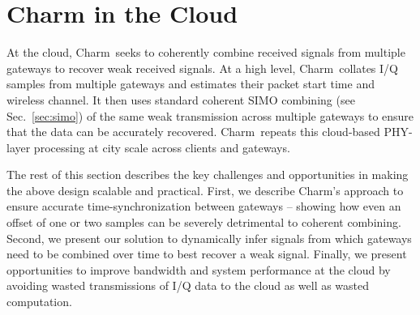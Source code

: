 \section{Charm in the Cloud}
\label{sec:cloud}


At the cloud, Charm\ seeks to coherently combine received signals from multiple gateways to recover weak received signals. At a high level, Charm\ collates I/Q samples from multiple gateways and estimates their packet start time and wireless channel. It then uses standard coherent SIMO combining (see Sec.~\ref{sec:simo}) of the same weak transmission across multiple gateways to ensure that the data can be accurately recovered. Charm\ repeats this cloud-based PHY-layer processing at city scale across clients and gateways. 

The rest of this section describes the key challenges and opportunities in making the above design scalable and practical. First, we describe Charm's approach to ensure accurate time-synchronization between gateways -- showing how even an offset of one or two samples can be severely detrimental to coherent combining. Second, we present our solution to dynamically infer signals from which gateways need to be combined over time to best recover a weak signal. Finally, we present opportunities to improve bandwidth and system performance at the cloud by avoiding wasted transmissions of I/Q data to the cloud as well as wasted computation.



